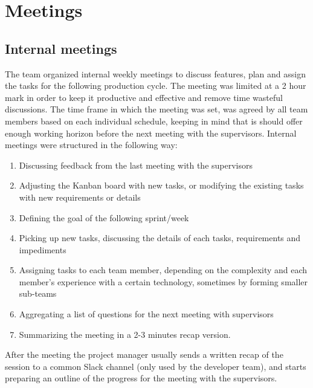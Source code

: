 
    \section{Meetings}
        \subsection{Internal meetings}
        The team organized internal weekly meetings to discuss features, plan and assign the tasks for the following production cycle. The meeting was limited at a 2 hour mark in order to keep it productive and effective and remove time wasteful discussions. The time frame in which the meeting was set, was agreed by all team members based on each individual schedule, keeping in mind that is should offer enough working horizon before the next meeting with the supervisors.
        Internal meetings were structured in the following way:
        \begin{enumerate}
            \item Discussing feedback from the last meeting with the supervisors
            \item Adjusting the Kanban board with new tasks, or modifying the existing tasks with new requirements or details
            \item Defining the goal of the following sprint/week
            \item Picking up new tasks, discussing the details of each tasks, requirements and impediments
            \item Assigning tasks to each team member, depending on the complexity and each member’s experience with a certain technology, sometimes by forming smaller sub-teams
            \item Aggregating a list of questions for the next meeting with supervisors
            \item Summarizing the meeting in a 2-3 minutes recap version.
        \end{enumerate}
        After the meeting the project manager usually sends a written recap of the session to a common Slack channel (only used by the developer team), and starts preparing an outline of the progress for the meeting with the supervisors.
        
